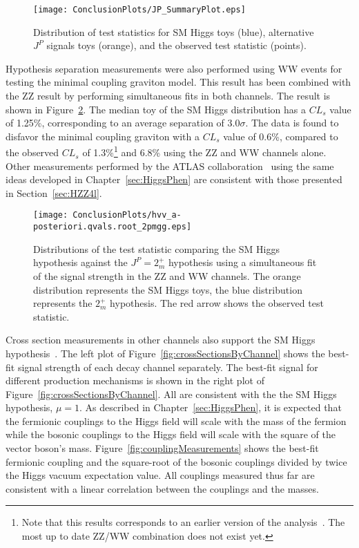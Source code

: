 \begin{figure}
\begin{center}
\texttt{[image: ConclusionPlots/JP\_SummaryPlot.eps]}
\caption{Distribution of test statistics for SM Higgs toys (blue),
 alternative $J^P$ signals toys (orange), and the observed test
statistic (points).}
\label{fig:spinParitySummary}

\end{center}
\end{figure}

Hypothesis separation measurements
were also performed using WW events for testing the minimal coupling
graviton model.
This result has been combined with the ZZ result by performing
simultaneous fits in both channels\cite{CMS:yva}.  The result
is shown in Figure~\ref{fig:2mp_spinCombination}.  The median
toy of the SM Higgs distribution
has a $CL_s$ value of 1.25\%, corresponding to an average
separation of $3.0\sigma$.  The data is found to disfavor the
minimal coupling graviton with a $CL_s$ value of 0.6\%, compared
to the observed $CL_s$ of 1.3\%\footnote{Note that this results
corresponds to an earlier version of the analysis~\cite{CMS:xwa}.
The most up to date ZZ/WW combination does not exist yet.}
and 6.8\% using the ZZ and WW channels alone.  Other measurements
performed by the ATLAS collaboration~\cite{ATLAS:2013mla,ATLAS:2013nma} using the same ideas developed in Chapter~\ref{sec:HiggsPhen}
are consistent with those presented in Section~\ref{sec:HZZ4l}.

\begin{figure}
\begin{center}
\texttt{[image: ConclusionPlots/hvv\_a-posteriori.qvals.root\_2pmgg.eps]}
\caption{Distributions of the test statistic comparing the 
SM Higgs hypothesis against the $J^P=2_m^+$ hypothesis using a
simultaneous fit of the signal strength in the ZZ and WW channels.
The orange distribution represents the SM Higgs toys, the blue 
distribution represents the $2_m^+$ hypothesis.  The red arrow
shows the observed test statistic. }
\label{fig:2mp_spinCombination}
\end{center}
\end{figure}

Cross section measurements in other channels also support the 
SM Higgs hypothesis~\cite{CMS:yva}.  The left plot of
Figure~\ref{fig:crossSectionsByChannel} shows the best-fit signal 
strength of each decay channel separately.  The best-fit signal
for different production mechanisms is shown
in the right plot of Figure~\ref{fig:crossSectionsByChannel}.
All are consistent with the the SM Higgs hypothesis,
$\mu=1$.  
As described in Chapter~\ref{sec:HiggsPhen}, it is expected that
the fermionic couplings to the Higgs field will scale with the
mass of the fermion while the bosonic couplings to the Higgs field
will scale with the square of the vector boson's mass.  
Figure~\ref{fig:couplingMeasurements} shows the best-fit
fermionic coupling and the square-root of the bosonic couplings
divided by twice the Higgs vacuum expectation value.
All couplings measured thus far are consistent with a linear
correlation between the couplings and the masses.  

